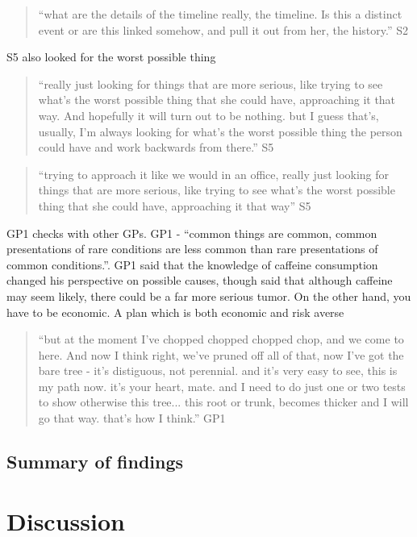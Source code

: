 \documentclass{sigchi}
\begin{document}
\begin{quote}
    ``what are the details of the timeline really, the timeline. Is this a distinct event or are this linked somehow, and pull it out from her, the history.''  S2
\end{quote}

S5 also looked for the worst possible thing

\begin{quote}
    ``really just looking for things that are more serious, like trying to see what's the worst possible thing that she could have, approaching it that way. And hopefully it will turn out to be nothing. but I guess that’s, usually, I'm always looking for what's the worst possible thing the person could have and work backwards from there.'' S5
\end{quote}

\begin{quote}
    ``trying to approach it like we would in an office, really just looking for things that are more serious, like trying to see what's the worst possible thing that she could have, approaching it that way'' S5
\end{quote}

GP1 checks with other GPs. GP1 - ``common things are common, common presentations of rare conditions are less common than rare presentations of common conditions.''. GP1 said that the knowledge of caffeine consumption changed his perspective on possible causes, though said that although caffeine may seem likely, there could be a far more serious tumor. On the other hand, you have to be economic. A plan which is both economic and risk averse

\begin{quote}
    ``but at the moment I've chopped chopped chopped chop, and we come to here. And now I think right, we've pruned off all of that, now I've got the bare tree - it's distiguous, not perennial. and it's very easy to see, this is my path now. it's your heart, mate. and I need to do just one or two tests to show otherwise this tree... this root or trunk, becomes thicker and I will go that way. that's how I think.'' GP1
\end{quote}


\subsection{Summary of findings}

\section{Discussion}
\end{document}
